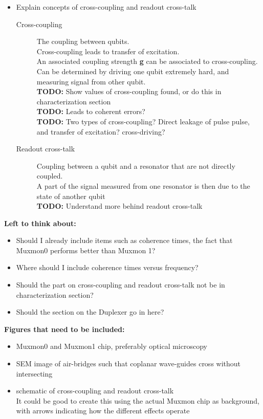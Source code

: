 \begin{itemize}
      \item Explain concepts of cross-coupling and readout cross-talk
      \begin{description}
        \item[Cross-coupling] The coupling between qubits. \\
                    Cross-coupling leads to transfer of excitation.\\
                    An associated coupling strength \textbf{g} can be associated to cross-coupling.\\
                    Can be determined by driving one qubit extremely hard, and measuring signal from other qubit.\\
                    \textbf{TODO:} Show values of cross-coupling found, or do this in characterization section \\
                    \textbf{TODO:} Leads to coherent errors? \\
                    \textbf{TODO:} Two types of cross-coupling? Direct leakage of pulse pulse, and transfer of excitation? cross-driving?
        \item[Readout cross-talk] Coupling between a qubit and a resonator that are not directly coupled.\\
                      A part of the signal measured from one resonator is then due to the state of another qubit \\
                      \textbf{TODO:} Understand more behind readout cross-talk
      \end{description}

    \end{itemize}

    \textbf{Left to think about:}
    \begin{itemize}
      \item Should I already include items such as coherence times, the fact that Muxmon0 performs better than Muxmon 1?
      \item Where should I include coherence times versus frequency?
      \item Should the part on cross-coupling and readout cross-talk not be in characterization section?
      \item Should the section on the Duplexer go in here?
    \end{itemize}

    \textbf{Figures that need to be included:}
    \begin{itemize}
      \item Muxmon0 and Muxmon1 chip, preferably optical microscopy
      \item SEM image of air-bridges such that coplanar wave-guides cross without intersecting
      \item schematic of cross-coupling and readout cross-talk \\
          It could be good to create this using the actual Muxmon chip as background, with arrows indicating how the different effects operate
    \end{itemize}


